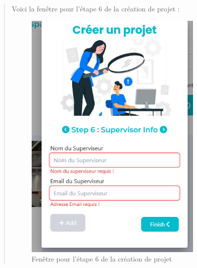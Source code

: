 \documentclass[a4paper,12pt]{article}
\begin{document}
\begin{quote}
Voici la fenêtre pour l'étape 6 de la création de projet :

\begin{figure}[H]
\centering
\includegraphics[width=0.85\textwidth]{IMAGES/etape6-projet.png}
\caption{Fenêtre pour l'étape 6 de la création de projet}
\label{fig:etape6projet}
\end{figure}
\end{quote}
\end{document}

